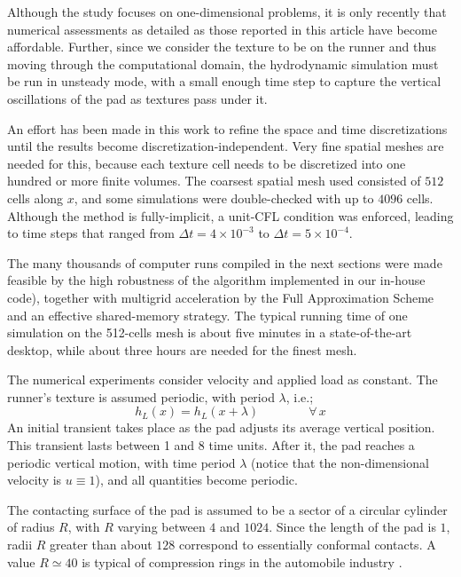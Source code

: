 Although the study focuses
on one-dimensional problems, it is only recently that 
numerical assessments as detailed as those reported in this
article have become affordable. 
Further, since we
consider the texture to be on the runner and thus moving through
the computational domain, the hydrodynamic simulation must
be run in unsteady mode, with a small enough time
step to capture the vertical oscillations of the pad as
textures pass under it. 

An effort has been made in this work to refine
the space and time discretizations until the results become
discretization-independent.
Very fine spatial meshes are needed for this,
because each texture cell needs
to be discretized into one hundred or more
finite volumes. The coarsest spatial mesh used consisted of $512$ 
cells along $x$, and some simulations were double-checked with up to $4096$
cells. Although the method is fully-implicit, a unit-CFL condition
was enforced, leading to time steps that ranged from $\Delta t = 4\times 10^{-3}$
to $\Delta t = 5 \times 10^{-4}$. 

The many thousands of computer runs compiled
in the next sections were made feasible by the
high robustness of the algorithm implemented in our in-house code\cite{ausas09}), %
together with multigrid acceleration by the
Full Approximation Scheme\cite{fulton1986,venner2000}%
and an effective shared-memory strategy.
The typical running time of one simulation
on the 512-cells mesh is about five minutes in a state-of-the-art desktop,
while about three hours are needed for the finest mesh.


The numerical experiments consider velocity and applied load as constant.
The runner's texture is assumed periodic, with period $\lambda$, i.e.;
$$
h_L(x) = h_L(x+\lambda)\qquad \qquad \forall \,x
$$
An initial transient takes place as the pad adjusts its average
vertical position. This transient lasts between 1 and 8 time units.
After it, the pad reaches a periodic vertical
motion, with time period $\lambda$ (notice that the non-dimensional
velocity is $u \equiv 1$), and all quantities become periodic.

The contacting surface of the pad is assumed to be a sector of
a circular cylinder of radius $R$, with $R$ varying between
$4$ and $1024$. Since the length of the pad is $1$,
radii $R$ greater than about $128$ correspond to essentially
conformal contacts. A value $R \simeq 40$ is typical of compression
rings in the automobile industry \cite{gad2012}.

